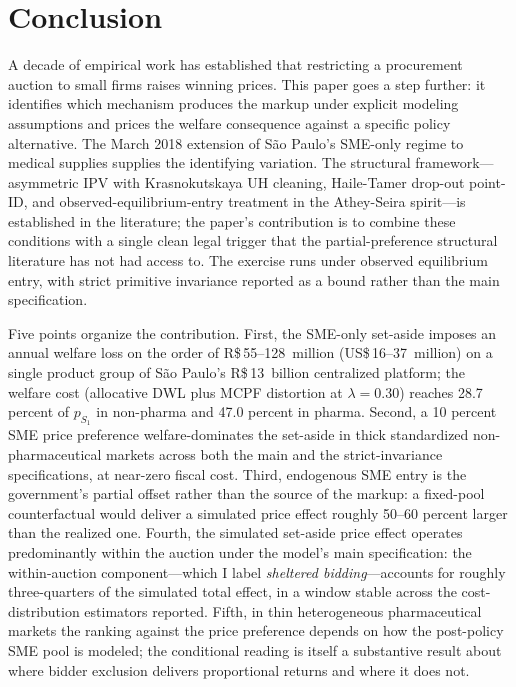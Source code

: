 \section{Conclusion}\label{sec:conclusion}

A decade of empirical work has established that restricting a procurement auction to small firms raises winning prices. This paper goes a step further: it identifies which mechanism produces the markup under explicit modeling assumptions and prices the welfare consequence against a specific policy alternative. The March 2018 extension of S\~ao Paulo's SME-only regime to medical supplies supplies the identifying variation. The structural framework---asymmetric IPV with Krasnokutskaya UH cleaning, Haile-Tamer drop-out point-ID, and observed-equilibrium-entry treatment in the Athey-Seira spirit---is established in the literature; the paper's contribution is to combine these conditions with a single clean legal trigger that the partial-preference structural literature has not had access to. The exercise runs under observed equilibrium entry, with strict primitive invariance reported as a bound rather than the main specification.

Five points organize the contribution. First, the SME-only set-aside imposes an annual welfare loss on the order of R\$\,55--128~million (US\$\,16--37~million) on a single product group of S\~ao Paulo's R\$\,13~billion centralized platform; the welfare cost (allocative DWL plus MCPF distortion at $\lambda = 0.30$) reaches 28.7 percent of $p_{S_1}$ in non-pharma and 47.0 percent in pharma. Second, a 10 percent SME price preference welfare-dominates the set-aside in thick standardized non-pharmaceutical markets across both the main and the strict-invariance specifications, at near-zero fiscal cost. Third, endogenous SME entry is the government's partial offset rather than the source of the markup: a fixed-pool counterfactual would deliver a simulated price effect roughly 50--60 percent larger than the realized one. Fourth, the simulated set-aside price effect operates predominantly within the auction under the model's main specification: the within-auction component---which I label \emph{sheltered bidding}---accounts for roughly three-quarters of the simulated total effect, in a window stable across the cost-distribution estimators reported. Fifth, in thin heterogeneous pharmaceutical markets the ranking against the price preference depends on how the post-policy SME pool is modeled; the conditional reading is itself a substantive result about where bidder exclusion delivers proportional returns and where it does not.

